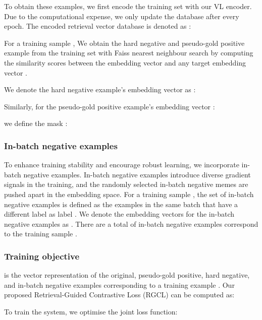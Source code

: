 \documentclass[11pt]{article}
\begin{document}
To obtain these examples, we first encode the training set with our VL encoder. Due to the computational expense, we only update the database after every epoch. The encoded retrieval vector database is denoted as :

For a training sample , We obtain the hard negative and pseudo-gold positive example from the training set with Faiss nearest neighbour search \cite{johnson_Faiss2019billion} by computing the similarity scores between the embedding vector  and any target embedding vector . 


We denote the hard negative example's embedding vector as :

Similarly, for the pseudo-gold positive example's embedding vector :

we define the mask :



\subsubsection{In-batch negative examples}
To enhance training stability and encourage robust learning, we incorporate in-batch negative examples. In-batch negative examples introduce diverse gradient signals in the training, and the randomly selected in-batch negative memes are pushed apart in the embedding space.
For a training sample , the set of in-batch negative examples is defined as the examples in the same batch that have a different label  as label . We denote the embedding vectors for the in-batch negative examples as . There are a total of  in-batch negative examples correspond to the training sample .
\subsubsection{Training objective}

is the vector representation of the original, pseudo-gold positive, hard negative, and in-batch negative examples corresponding to a training example .
Our proposed Retrieval-Guided Contrastive Loss (RGCL) can be computed as:

To train the system, we optimise the joint loss function:
\end{document}
